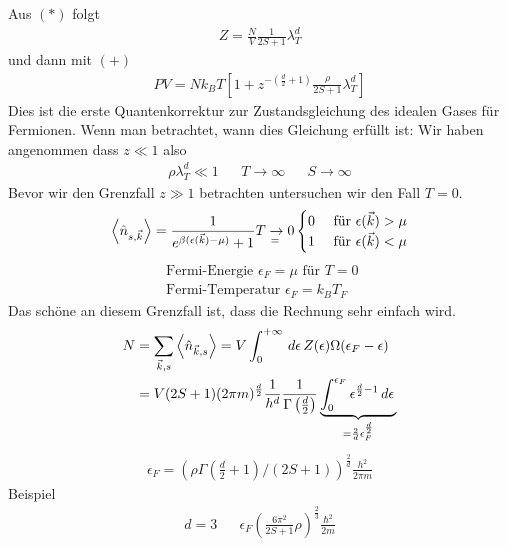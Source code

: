 %
Aus $(*)$ folgt
%
\begin{align*}
  Z = \frac{N}{V} 
  \frac{1}{2 S + 1} \lambda_T^d
\end{align*}
%
und dann mit $(+)$
%
\begin{align*}
  PV = N k_B T \left[ 1 + z^{-\left( \frac{d}{2} + 1 \right)} 
  \frac{\rho }{2 S + 1} \lambda_T ^d \right]
\end{align*}
%
Dies ist die erste Quantenkorrektur zur Zustandsgleichung des idealen Gases für
Fermionen. Wenn man betrachtet, wann dies Gleichung erfüllt ist:
Wir haben angenommen dass $z \ll 1$ also
%
\begin{align*}
  \rho \lambda_T^d \ll 1 && T \to \infty && S \to \infty
\end{align*}
%
Bevor wir den Grenzfall $ z \gg 1 $ betrachten untersuchen wir den Fall
$T = 0$. 
%
\begin{align*}
  \Braket{\hat{n}_{s ,\vec{k}}} = \frac{1}{e^{\beta(\epsilon(\vec{k}) - \mu)} + 1}
  \underset{=}{T\to0} \begin{cases}
    0 & \text{ für } \epsilon(\vec{k}) > \mu \\
    1 & \text{ für } \epsilon(\vec{k}) < \mu \\
  \end{cases} 
\end{align*}
%
%
\begin{align*}
  \text{ Fermi-Energie } \epsilon_F = \mu \text{ für } T = 0\\
  \text{ Fermi-Temperatur } \epsilon_F = k_B T_F
\end{align*}
%
Das schöne an diesem Grenzfall ist, dass die Rechnung sehr einfach wird.
%
\begin{align*}
  N & = \sum_{\vec{k},s}^{} \Braket{\hat{n}_{\vec{k},s}} = 
  V \int_{0}^{+ \infty} \,d\epsilon\, Z(\epsilon) \Omega(\epsilon_F - \epsilon) \\
  & = V (2 S + 1)
  (2 \pi m)^{\frac{d}{2}}\frac{1}{h^d} 
  \frac{1}{\Gamma\left( \frac{d}{2} \right)} \underbrace{\int_{0}^{\epsilon_F}
  \epsilon^{\frac{d}{2} - 1} \,d\epsilon\,}_{ = \frac{2}{d} \epsilon_F^{\frac{d}{2}}}
\end{align*}
%
%
\begin{align*}
  \epsilon_F = \left( \rho
  \Gamma\left( \frac{d}{2} + 1 \right)/ (2S + 1) \right)^{\frac{2}{d}}
  \frac{h^2 }{2 \pi m}
\end{align*}
%
Beispiel 
%
\begin{align*}
  d = 3 && \epsilon_F 
  \left( \frac{6 \pi^2}{2 S + 1} \rho \right)^{\frac{2}{3}} 
  \frac{\hbar^2}{2 m}
\end{align*}
